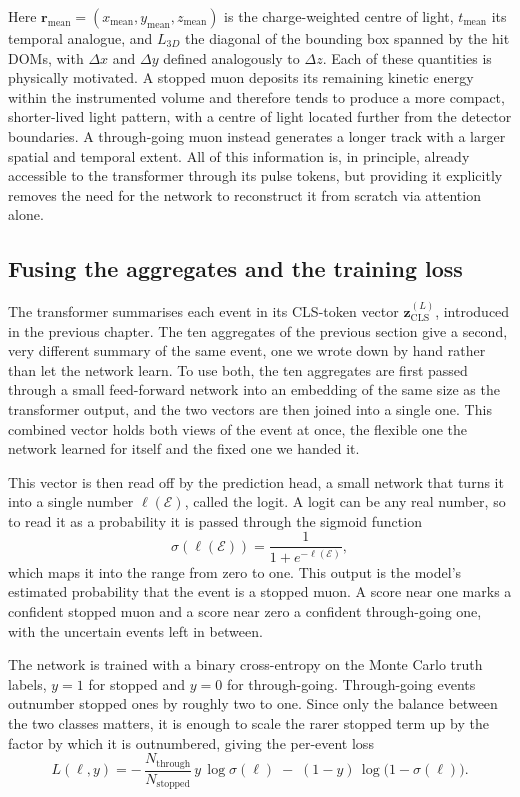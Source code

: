 Here $\mathbf{r}_{\mathrm{mean}} = (x_{\mathrm{mean}},y_{\mathrm{mean}},z_{\mathrm{mean}})$ is the charge-weighted centre of light, $t_{\mathrm{mean}}$ its temporal analogue, and $L_{3D}$ the diagonal of the bounding box spanned by the hit DOMs, with $\Delta x$ and $\Delta y$ defined analogously to $\Delta z$. Each of these quantities is physically motivated. A stopped muon deposits its remaining kinetic energy within the instrumented volume and therefore tends to produce a more compact, shorter-lived light pattern, with a centre of light located further from the detector boundaries. A through-going muon instead generates a longer track with a larger spatial and temporal extent. All of this information is, in principle, already accessible to the transformer through its pulse tokens, but providing it explicitly removes the need for the network to reconstruct it from scratch via attention alone.


\subsection{Fusing the aggregates and the training loss}

The transformer summarises each event in its CLS-token vector $\mathbf{z}_{\mathrm{CLS}}^{(L)}$, introduced in the previous chapter. The ten aggregates of the previous section give a second, very different summary of the same event, one we wrote down by hand rather than let the network learn. To use both, the ten aggregates are first passed through a small feed-forward network into an embedding of the same size as the transformer output, and the two vectors are then joined into a single one. This combined vector holds both views of the event at once, the flexible one the network learned for itself and the fixed one we handed it.

This vector is then read off by the prediction head, a small network that turns it into a single number $\ell(\mathcal{E})$, called the logit. A logit can be any real number, so to read it as a probability it is passed through the sigmoid function $$\sigma(\ell(\mathcal{E}))=\frac{1}{1+e^{-\ell(\mathcal{E})}},$$ which maps it into the range from zero to one. This output is the model's estimated probability that the event is a stopped muon. A score near one marks a confident stopped muon and a score near zero a confident through-going one, with the uncertain events left in between.

The network is trained with a binary cross-entropy on the Monte Carlo truth labels, $y=1$ for stopped and $y=0$ for through-going. Through-going events outnumber stopped ones by roughly two to one. Since only the balance between the two classes matters, it is enough to scale the rarer stopped term up by the factor by which it is outnumbered, giving the per-event loss
\[
    L(\ell,y) = -\,\frac{N_{\mathrm{through}}}{N_{\mathrm{stopped}}}\,y\,\log\sigma(\ell) \;-\; (1-y)\,\log\bigl(1-\sigma(\ell)\bigr).
\]



